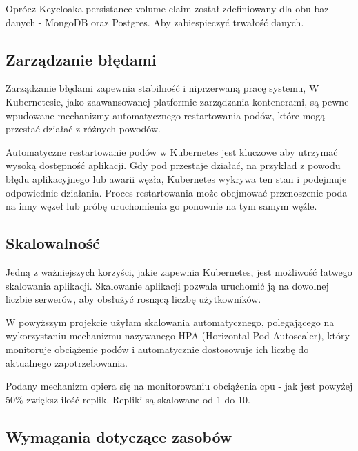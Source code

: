 \documentclass[12pt,a4paper]{article}
\begin{document}
Oprócz Keycloaka persistance volume claim został zdefiniowany dla obu baz danych - MongoDB oraz Postgres. Aby zabiespieczyć trwałość danych.
\subsection{Zarządzanie błędami}
\label{sec:ERD} 


Zarządzanie błędami zapewnia stabilność i niprzerwaną pracę systemu, W Kubernetesie, jako zaawansowanej platformie zarządzania kontenerami, są pewne wpudowane mechanizmy automatycznego restartowania podów, które mogą przestać działać z różnych powodów.

Automatyczne restartowanie podów w Kubernetes jest kluczowe aby utrzymać wysoką dostępność aplikacji. Gdy pod przestaje działać, na przykład z powodu błędu aplikacyjnego lub awarii węzła, Kubernetes wykrywa ten stan i podejmuje odpowiednie działania. Proces restartowania może obejmować przenoszenie poda na inny węzeł lub próbę uruchomienia go ponownie na tym samym węźle.




\subsection{Skalowalność}
\label{sec:ExamplesSection}



Jedną z ważniejszych korzyści, jakie zapewnia Kubernetes, jest możliwość łatwego skalowania aplikacji. Skalowanie aplikacji pozwala uruchomić ją na dowolnej liczbie serwerów, aby obsłużyć rosnącą liczbę użytkowników.\cite{oktawave}

W powyższym projekcie użyłam skalowania automatycznego, polegającego na wykorzystaniu mechanizmu nazywanego HPA (Horizontal Pod Autoscaler), który monitoruje obciążenie podów i automatycznie dostosowuje ich liczbę do aktualnego zapotrzebowania. 

Podany mechanizm opiera się na monitorowaniu obciążenia cpu - jak jest powyżej 50\% zwiększ ilość replik. Repliki są skalowane od 1 do 10.

\subsection{Wymagania dotyczące zasobów}
\label{sec:ExampleTables}
\end{document}
